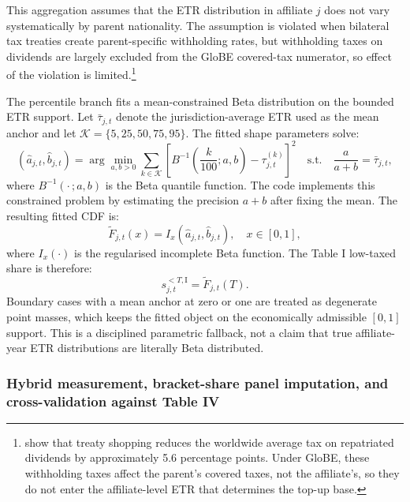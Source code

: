 \documentclass[11pt,a4paper]{article}
\begin{document}
This aggregation assumes that the ETR distribution in affiliate $j$ does not vary systematically by parent nationality. The assumption is violated when bilateral tax treaties create parent-specific withholding rates, but withholding taxes on dividends are largely excluded from the GloBE covered-tax numerator, so effect of the violation is limited.\footnote{\citet{riet2025} show that treaty shopping reduces the worldwide average tax on repatriated dividends by approximately 5.6 percentage points. Under GloBE, these withholding taxes affect the parent's covered taxes, not the affiliate's, so they do not enter the affiliate-level ETR that determines the top-up base.}

The percentile branch fits a mean-constrained Beta distribution on the bounded ETR support. Let $\bar{\tau}_{j,t}$ denote the jurisdiction-average ETR used as the mean anchor and let $\mathcal{K}=\{5,25,50,75,95\}$. The fitted shape parameters solve:
\begin{equation}\label{eq:beta_fit}
(\hat{a}_{j,t},\hat{b}_{j,t})
= \arg\min_{a,b>0}
\sum_{k \in \mathcal{K}}
\left[
B^{-1}\!\left(\frac{k}{100};a,b\right) - \tau_{j,t}^{(k)}
\right]^2
\quad
\text{s.t.}\quad
\frac{a}{a+b}=\bar{\tau}_{j,t},
\end{equation}
where $B^{-1}(\cdot\,;a,b)$ is the Beta quantile function. The code implements this constrained problem by estimating the precision $a+b$ after fixing the mean. The resulting fitted CDF is:
\begin{equation}\label{eq:beta_cdf}
\tilde{F}_{j,t}(x)=I_x(\hat{a}_{j,t},\hat{b}_{j,t}), \quad x\in[0,1],
\end{equation}
where $I_x(\cdot)$ is the regularised incomplete Beta function. The Table I low-taxed share is therefore:
\begin{equation}\label{eq:lowtax_share}
s_{j,t}^{<T,\text{I}}=\tilde{F}_{j,t}(T).
\end{equation}
Boundary cases with a mean anchor at zero or one are treated as degenerate point masses, which keeps the fitted object on the economically admissible $[0,1]$ support. This is a disciplined parametric fallback, not a claim that true affiliate-year ETR distributions are literally Beta distributed.

\subsubsection{Hybrid measurement, bracket-share panel imputation, and cross-validation against Table IV}\label{sec:crossval}
\end{document}
